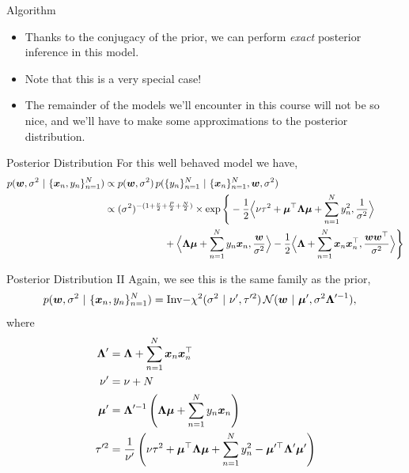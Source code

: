 \documentclass[aspectratio=169]{beamer}
\begin{document}
\begin{frame}{Algorithm}
\begin{itemize}

\item Thanks to the conjugacy of the prior, we can perform \emph{exact} posterior inference in this model. 

\item Note that this is a very special case! 

\item The remainder of the models we'll encounter in this course will not be so nice, and we'll have to make some approximations to the posterior distribution.
\end{itemize}

\end{frame}

\begin{frame}{Posterior Distribution}
For this well behaved model we have,
\begin{align}
    p(\boldsymbol{w}, \sigma^2 ~\vert~ \{\boldsymbol{x}_n, y_n\}_{n=1}^N) &\propto
    p(\boldsymbol{w}, \sigma^2) \, p(\{y_n\}_{n=1}^N ~\vert~ \{\boldsymbol{x}_n\}_{n=1}^N, \boldsymbol{w}, \sigma^2)  \\
    \nonumber
    & \propto (\sigma^2)^{-(1 + \frac{\nu}{2} + \frac{P}{2} + \frac{N}{2})} 
    \times \exp \Bigg \{ 
    -\frac{1}{2} \Big \langle \nu \tau^2 + \boldsymbol{\mu}^\top \boldsymbol{\Lambda} \boldsymbol{\mu} + \sum_{n=1}^N y_n^2, \frac{1}{\sigma^2} \Big \rangle  \\
    \nonumber
    &\hspace{6em}
    + \Big \langle \boldsymbol{\Lambda} \boldsymbol{\mu} + \sum_{n=1}^N y_n \boldsymbol{x}_n, \frac{\boldsymbol{w}}{\sigma^2} \Big \rangle 
    -\frac{1}{2} \Big \langle \boldsymbol{\Lambda} + \sum_{n=1}^N \boldsymbol{x}_n \boldsymbol{x}_n^\top, \frac{\boldsymbol{w} \boldsymbol{w}^\top}{\sigma^2} \Big \rangle
    \Bigg \}
\end{align}
    
\end{frame}

\begin{frame}{Posterior Distribution II}
Again, we see this is the same family as the prior,
\begin{align}
    p(\boldsymbol{w}, \sigma^2 ~\vert~ \{\boldsymbol{x}_n, y_n\}_{n=1}^N) &= 
    \mathrm{Inv-}\chi^2(\sigma^2 ~\vert~ \nu', \tau'^2) \, \mathcal{N}(\boldsymbol{w} ~\vert~ \boldsymbol{\mu}', \sigma^2 \boldsymbol{\Lambda}'^{-1}),
\end{align}
where 
\begin{align}
    \boldsymbol{\Lambda}' &= \boldsymbol{\Lambda} + \sum_{n=1}^N \boldsymbol{x}_n \boldsymbol{x}_n^\top \\
    \nu' &= \nu + N \\
    \boldsymbol{\mu}' &= \boldsymbol{\Lambda}'^{-1} \left(\boldsymbol{\Lambda} \boldsymbol{\mu} + \sum_{n=1}^N y_n \boldsymbol{x}_n \right) \\
    \tau'^2 &= \frac{1}{\nu'} \left(\nu \tau^2 + \boldsymbol{\mu}^\top \boldsymbol{\Lambda} \boldsymbol{\mu} + \sum_{n=1}^N y_n^2 - \boldsymbol{\mu}'^\top \boldsymbol{\Lambda}' \boldsymbol{\mu}'\right)
\end{align}
    
\end{frame}
\end{document}
